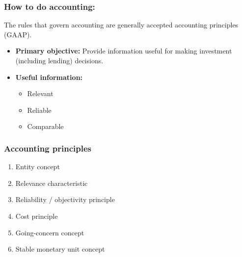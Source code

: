 \subsubsection{How to do accounting:}
\begin{definition}
    The rules that govern accounting are generally accepted accounting principles (GAAP).
    \begin{itemize}
        \item \textbf{Primary objective:} Provide information useful for making investment (including lending) decisions.
        \item \textbf{Useful information:}
        \begin{itemize}
            \item Relevant 
            \item Reliable 
            \item Comparable
        \end{itemize}
    \end{itemize}
\end{definition}

\subsubsection{Accounting principles}
\begin{definition}
    \begin{enumerate}
        \item Entity concept
        \item Relevance characteristic
        \item Reliability / objectivity principle
        \item Cost principle
        \item Going-concern concept
        \item Stable monetary unit concept
    \end{enumerate}    
\end{definition}


